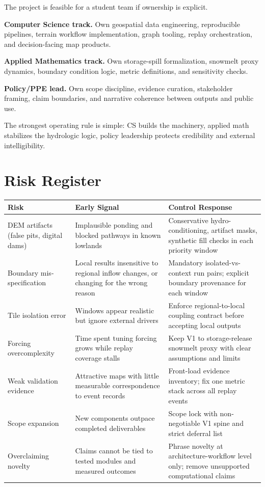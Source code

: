 \documentclass[11pt,a4paper]{article}
\begin{document}
The project is feasible for a student team if ownership is explicit.

\textbf{Computer Science track.} Own geospatial data engineering, reproducible pipelines, terrain workflow implementation, graph tooling, replay orchestration, and decision-facing map products.

\textbf{Applied Mathematics track.} Own storage-spill formalization, snowmelt proxy dynamics, boundary condition logic, metric definitions, and sensitivity checks.

\textbf{Policy/PPE lead.} Own scope discipline, evidence curation, stakeholder framing, claim boundaries, and narrative coherence between outputs and public use.

The strongest operating rule is simple: CS builds the machinery, applied math stabilizes the hydrologic logic, policy leadership protects credibility and external intelligibility.

\section{Risk Register}

\renewcommand{\arraystretch}{1.2}
\begin{tabularx}{\textwidth}{>{\raggedright\arraybackslash}p{} >{\raggedright\arraybackslash}X >{\raggedright\arraybackslash}X}
\toprule
\textbf{Risk} & \textbf{Early Signal} & \textbf{Control Response} \\
\midrule
DEM artifacts (false pits, digital dams) & Implausible ponding and blocked pathways in known lowlands & Conservative hydro-conditioning, artifact masks, synthetic fill checks in each priority window \\
Boundary mis-specification & Local results insensitive to regional inflow changes, or changing for the wrong reason & Mandatory isolated-vs-context run pairs; explicit boundary provenance for each window \\
Tile isolation error & Windows appear realistic but ignore external drivers & Enforce regional-to-local coupling contract before accepting local outputs \\
Forcing overcomplexity & Time spent tuning forcing grows while replay coverage stalls & Keep V1 to storage-release snowmelt proxy with clear assumptions and limits \\
Weak validation evidence & Attractive maps with little measurable correspondence to event records & Front-load evidence inventory; fix one metric stack across all replay events \\
Scope expansion & New components outpace completed deliverables & Scope lock with non-negotiable V1 spine and strict deferral list \\
Overclaiming novelty & Claims cannot be tied to tested modules and measured outcomes & Phrase novelty at architecture-workflow level only; remove unsupported computational claims \\
\bottomrule
\end{tabularx}
\end{document}
